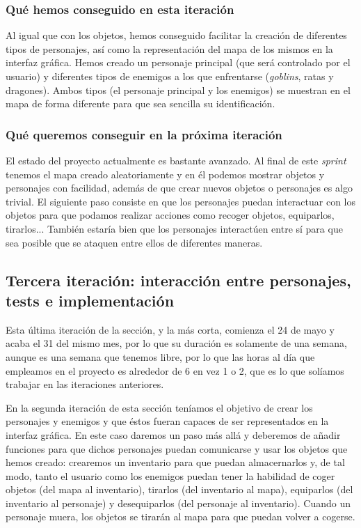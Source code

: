 \subsubsection{Qué hemos conseguido en esta iteración}

Al igual que con los objetos, hemos conseguido facilitar la creación de diferentes tipos de personajes, así como la representación del mapa de los mismos en la interfaz gráfica. 
Hemos creado un personaje principal (que será controlado por el usuario) y diferentes tipos de enemigos a los que enfrentarse (\textit{goblins}, ratas y dragones). Ambos tipos (el personaje principal y los enemigos) se muestran en el mapa de forma diferente para que sea sencilla su identificación.

\subsubsection{Qué queremos conseguir en la próxima iteración}

El estado del proyecto actualmente es bastante avanzado. Al final de este \textit{sprint} tenemos el mapa creado aleatoriamente y en él podemos mostrar objetos y personajes con facilidad, además de que crear nuevos objetos o personajes es algo trivial. El siguiente paso consiste en que los personajes puedan interactuar con los objetos para que podamos realizar acciones como recoger objetos, equiparlos, tirarlos... También estaría bien que los personajes interactúen entre sí para que sea posible que se ataquen entre ellos de diferentes maneras.

\subsection{Tercera iteración: interacción entre personajes, tests e implementación}

Esta última iteración de la sección, y la más corta, comienza el 24 de mayo y acaba el 31 del mismo mes, por lo que su duración es solamente de una semana, aunque es una semana que tenemos libre, por lo que las horas al día que empleamos en el proyecto es alrededor de 6 en vez 1 o 2, que es lo que solíamos trabajar en las iteraciones anteriores.

En la segunda iteración de esta sección teníamos el objetivo de crear los personajes y enemigos y que éstos fueran capaces de ser representados en la interfaz gráfica. En este caso daremos un paso más allá y deberemos de añadir funciones para que dichos personajes puedan comunicarse y usar los objetos que hemos creado: crearemos un inventario para que puedan almacernarlos y, de tal modo, tanto el usuario como los enemigos puedan tener la habilidad de coger objetos (del mapa al inventario), tirarlos (del inventario al mapa), equiparlos (del inventario al personaje) y desequiparlos (del personaje al inventario). Cuando un personaje muera, los objetos se tirarán al mapa para que puedan volver a cogerse.

